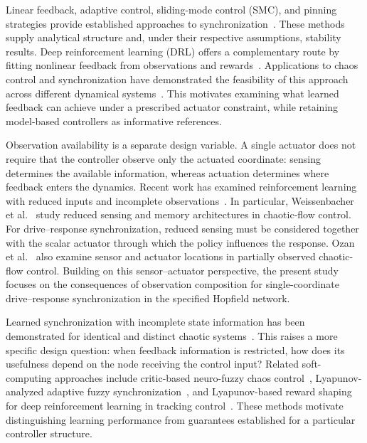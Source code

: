 \documentclass[a4paper,fleqn]{cas-dc}
\theoremstyle{plain}
\theoremstyle{definition}
\begin{document}
Linear feedback, adaptive control, sliding-mode control (SMC), and pinning strategies provide established approaches to synchronization~\cite{yassen2005controlling,wang2003feedback,feki2009sliding,su2021fixed,chen2014pinning}. These methods supply analytical structure and, under their respective assumptions, stability results. Deep reinforcement learning (DRL) offers a complementary route by fitting nonlinear feedback from observations and rewards~\cite{sutton2018reinforcement,bucci2019control,carlucho2020adaptive}. Applications to chaos control and synchronization have demonstrated the feasibility of this approach across different dynamical systems~\cite{vashishtha2020restoring,han2021control,cheng2023deep,cheng2025generalized,yau2024ppo,xu2025ppo}. This motivates examining what learned feedback can achieve under a prescribed actuator constraint, while retaining model-based controllers as informative references.

Observation availability is a separate design variable. A single actuator does not require that the controller observe only the actuated coordinate: sensing determines the available information, whereas actuation determines where feedback enters the dynamics. Recent work has examined reinforcement learning with reduced inputs and incomplete observations~\cite{jin2025Deep,weissenbacher2025reinforcement}. In particular, Weissenbacher et al.~\cite{weissenbacher2025reinforcement} study reduced sensing and memory architectures in chaotic-flow control. For drive--response synchronization, reduced sensing must be considered together with the scalar actuator through which the policy influences the response. Ozan et al.~\cite{ozan2025data} also examine sensor and actuator locations in partially observed chaotic-flow control. Building on this sensor--actuator perspective, the present study focuses on the consequences of observation composition for single-coordinate drive--response synchronization in the specified Hopfield network.

Learned synchronization with incomplete state information has been demonstrated for identical and distinct chaotic systems~\cite{cheng2023deep,cheng2025generalized}. This raises a more specific design question: when feedback information is restricted, how does its usefulness depend on the node receiving the control input? Related soft-computing approaches include critic-based neuro-fuzzy chaos control~\cite{tooranjipour2018critic}, Lyapunov-analyzed adaptive fuzzy synchronization~\cite{akbarzadeh2017synchronization}, and Lyapunov-based reward shaping for deep reinforcement learning in tracking control~\cite{viswanadhapalli2024reward}. These methods motivate distinguishing learning performance from guarantees established for a particular controller structure.
\end{document}
